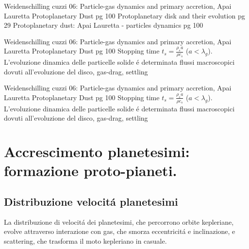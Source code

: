 \begin{workout}
Weidenschilling cuzzi 06: Particle-gas dynamics and primary accretion, Apai Lauretta Protoplanetary Dust pg 100
Protoplanetary disk and their evolution pg 29
Protoplanetary dust: Apai Lauretta - particles dynamics pg 100
\end{workout}

\begin{workout}
Weidenschilling cuzzi 06: Particle-gas dynamics and primary accretion, Apai Lauretta Protoplanetary Dust pg 100
Stopping time $t_s=\frac{\rho_sa}{\rho c_s}$ ($a<\lambda_g$). L'evoluzione dinamica delle particelle solide \'e determinata flussi macroscopici dovuti all'evoluzione del disco, gas-drag, settling
\end{workout}

\begin{workout}
Weidenschilling cuzzi 06: Particle-gas dynamics and primary accretion, Apai Lauretta Protoplanetary Dust pg 100
Stopping time $t_s=\frac{\rho_sa}{\rho c_s}$ ($a<\lambda_g$). L'evoluzione dinamica delle particelle solide \'e determinata flussi macroscopici dovuti all'evoluzione del disco, gas-drag, settling
\end{workout}

\section{Accrescimento planetesimi: formazione proto-pianeti.}

\subsection{Distribuzione velocit\'a planetesimi}
La distribuzione di velocit\'a dei planetesimi, che percorrono orbite kepleriane, evolve attraverso interazione con gas, che smorza eccentricit\'a e inclinazione, e scattering, che trasforma il moto kepleriano in casuale.


